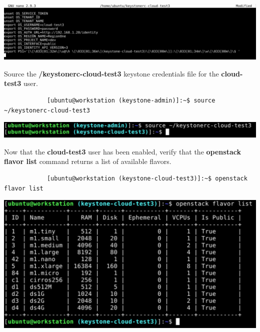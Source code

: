 \documentclass[letterpaper, 12pt]{article}
\begin{document}
\begin{enumerate}
\begin{labstep}
        \begin{center}
            \includegraphics[width=\linewidth]{images/part4/step19.png}
        \end{center}
    \end{labstep}

    \begin{labstep}
        Source the \textbf{\texttildemid/keystonerc-cloud-test3} keystone credentials file for the
        \textbf{cloud-test3} user.
        \begin{lstlisting}
            [ubuntu@workstation (keystone-admin)]:~$ source ~/keystonerc-cloud-test3
        \end{lstlisting}

        \begin{center}
            \includegraphics[width=\linewidth]{images/part4/step20.png}
        \end{center}
    \end{labstep}

    \begin{labstep}
        Now that the \textbf{cloud-test3} user has been enabled, verify that the \textbf{openstack flavor list} command returns a list of available flavors.
        \begin{lstlisting}
            [ubuntu@workstation (keystone-cloud-test3)]:~$ openstack flavor list
        \end{lstlisting}

        \begin{center}
            \includegraphics[width=\linewidth]{images/part4/step21.png}
        \end{center}
    \end{labstep}


\end{enumerate}
\end{document}
